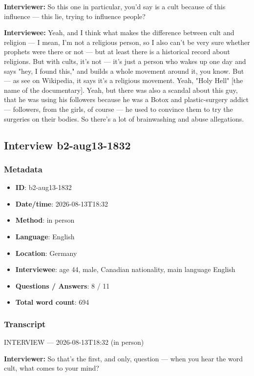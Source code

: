 \textbf{Interviewer:} So this one in particular, you'd say is a cult because of this influence — this lie, trying to influence people?

\textbf{Interviewee:} Yeah, and I think what makes the difference between cult and religion — I mean, I'm not a religious person, so I also can't be very sure whether prophets were there or not — but at least there is a historical record about religions. But with cults, it's not — it's just a person who wakes up one day and says "hey, I found this," and builds a whole movement around it, you know. But — as see on Wikipedia, it says it's a religious movement. Yeah, "Holy Hell" [the name of the documentary]. Yeah, but there was also a scandal about this guy, that he was using his followers because he was a Botox and plastic-surgery addict — followers, from the girls, of course — he used to convince them to try the surgeries on their bodies. So there's a lot of brainwashing and abuse allegations.

\subsection{Interview b2-aug13-1832}\label{int:b2-aug13-1832}
\subsubsection*{Metadata}
\begin{itemize}
  \item \textbf{ID}: b2-aug13-1832
  \item \textbf{Date/time}: 2026-08-13T18:32
  \item \textbf{Method}: in person
  \item \textbf{Language}: English
  \item \textbf{Location}: Germany
  \item \textbf{Interviewee}: age 44, male, Canadian nationality, main language English
  \item \textbf{Questions / Answers}: 8 / 11
  \item \textbf{Total word count}: 694
\end{itemize}
\subsubsection*{Transcript}
INTERVIEW — 2026-08-13T18:32 (in person)

\textbf{Interviewer:} So that's the first, and only, question — when you hear the word cult, what comes to your mind?

